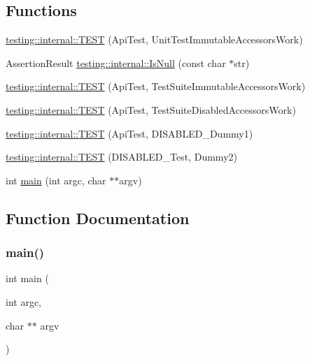 \subsection*{Functions}
\begin{DoxyCompactItemize}
\item 
\mbox{\hyperlink{namespacetesting_1_1internal_a9ac879683abb06d1c0bba3a339ea2f40}{testing\+::internal\+::\+T\+E\+ST}} (Api\+Test, Unit\+Test\+Immutable\+Accessors\+Work)
\item 
Assertion\+Result \mbox{\hyperlink{namespacetesting_1_1internal_adcfd37a66bc4cb0e8291cf46e1a6c72b}{testing\+::internal\+::\+Is\+Null}} (const char $\ast$str)
\item 
\mbox{\hyperlink{namespacetesting_1_1internal_a1aef4ac7102e97f0941178e0ecf5c776}{testing\+::internal\+::\+T\+E\+ST}} (Api\+Test, Test\+Suite\+Immutable\+Accessors\+Work)
\item 
\mbox{\hyperlink{namespacetesting_1_1internal_a765c62c0b121a84326d39383273f7c91}{testing\+::internal\+::\+T\+E\+ST}} (Api\+Test, Test\+Suite\+Disabled\+Accessors\+Work)
\item 
\mbox{\hyperlink{namespacetesting_1_1internal_a9ed5f89c92532506899e3908e79af4de}{testing\+::internal\+::\+T\+E\+ST}} (Api\+Test, D\+I\+S\+A\+B\+L\+E\+D\+\_\+\+Dummy1)
\item 
\mbox{\hyperlink{namespacetesting_1_1internal_a4a84433419426d1c1b87ce998267b0d4}{testing\+::internal\+::\+T\+E\+ST}} (D\+I\+S\+A\+B\+L\+E\+D\+\_\+\+Test, Dummy2)
\item 
int \mbox{\hyperlink{_obj__test_2lib_2googletest-master_2googletest_2test_2gtest-unittest-api__test_8cc_a3c04138a5bfe5d72780bb7e82a18e627}{main}} (int argc, char $\ast$$\ast$argv)
\end{DoxyCompactItemize}


\subsection{Function Documentation}
\mbox{\label{_obj__test_2lib_2googletest-master_2googletest_2test_2gtest-unittest-api__test_8cc_a3c04138a5bfe5d72780bb7e82a18e627}} 
\subsubsection{\texorpdfstring{main()}{main()}}
{\footnotesize\ttfamily int main (\begin{DoxyParamCaption}\item[{int}]{argc,  }\item[{char $\ast$$\ast$}]{argv }\end{DoxyParamCaption})}

